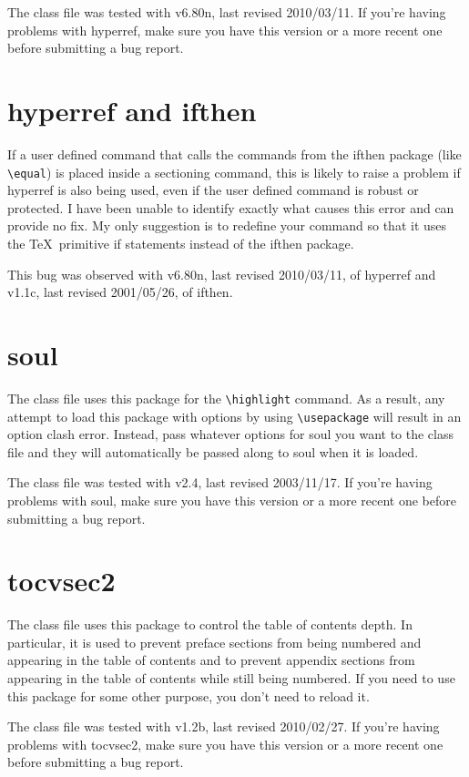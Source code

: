 The class file was tested with v6.80n, last revised 2010/03/11.  If you're having problems with hyperref, make sure you have this version or a more recent one before submitting a bug report.

\section{hyperref and ifthen}
If a user defined command that calls the commands from the ifthen package (like \verb=\equal=) is placed inside a sectioning command, this is likely to raise a problem if hyperref is also being used, even if the user defined command is robust or protected.  I have been unable to identify exactly what causes this error and can provide no fix.  My only suggestion is to redefine your command so that it uses the \TeX\ primitive if statements instead of the ifthen package.

This bug was observed with v6.80n, last revised 2010/03/11, of hyperref and v1.1c, last revised 2001/05/26, of ifthen.

\section{soul}
The class file uses this package for the \verb=\highlight= command.  As a result, any attempt to load this package with options by using \verb=\usepackage= will result in an option clash error.  Instead, pass whatever options for soul you want to the class file and they will automatically be passed along to soul when it is loaded.

The class file was tested with v2.4, last revised 2003/11/17.  If you're having problems with soul, make sure you have this version or a more recent one before submitting a bug report.

\section{tocvsec2}
The class file uses this package to control the table of contents depth.  In particular, it is used to prevent preface sections from being numbered and appearing in the table of contents and to prevent appendix sections from appearing in the table of contents while still being numbered.  If you need to use this package for some other purpose, you don't need to reload it.

The class file was tested with v1.2b, last revised 2010/02/27.  If you're having problems with tocvsec2, make sure you have this version or a more recent one before submitting a bug report.


